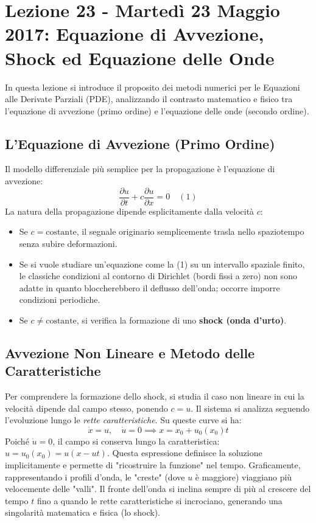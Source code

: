 \documentclass[12pt,a4paper]{article}
\begin{document}
\newpage
\section{Lezione 23 - Martedì 23 Maggio 2017: Equazione di Avvezione, Shock ed Equazione delle Onde}

In questa lezione si introduce il proposito dei metodi numerici per le Equazioni alle Derivate Parziali (PDE), analizzando il contrasto matematico e fisico tra l'equazione di avvezione (primo ordine) e l'equazione delle onde (secondo ordine).

\subsection{L'Equazione di Avvezione (Primo Ordine)}
Il modello differenziale più semplice per la propagazione è l'equazione di avvezione:
\begin{equation}
\frac{\partial u}{\partial t} + c \frac{\partial u}{\partial x} = 0 \quad (1)
\end{equation}
La natura della propagazione dipende esplicitamente dalla velocità $c$:
\begin{itemize}
    \item Se $c = \text{costante}$, il segnale originario semplicemente trasla nello spaziotempo senza subire deformazioni.
    \item Se si vuole studiare un'equazione come la (1) su un intervallo spaziale finito, le classiche condizioni al contorno di Dirichlet (bordi fissi a zero) non sono adatte in quanto bloccherebbero il deflusso dell'onda; occorre imporre condizioni periodiche.
    \item Se $c \neq \text{costante}$, si verifica la formazione di uno \textbf{shock (onda d'urto)}.
\end{itemize}

\subsection{Avvezione Non Lineare e Metodo delle Caratteristiche}
Per comprendere la formazione dello shock, si studia il caso non lineare in cui la velocità dipende dal campo stesso, ponendo $c = u$.
Il sistema si analizza seguendo l'evoluzione lungo le \textit{rette caratteristiche}. Su queste curve si ha:
\begin{equation}
\dot{x} = u, \quad \dot{u} = 0 \implies x = x_0 + u_0(x_0)t
\end{equation}
Poiché $\dot{u} = 0$, il campo si conserva lungo la caratteristica: $u = u_0(x_0) = u(x - ut)$. Questa espressione definisce la soluzione implicitamente e permette di "ricostruire la funzione" nel tempo.
Graficamente, rappresentando i profili d'onda, le "creste" (dove $u$ è maggiore) viaggiano più velocemente delle "valli". Il fronte dell'onda si inclina sempre di più al crescere del tempo $t$ fino a quando le rette caratteristiche si incrociano, generando una singolarità matematica e fisica (lo shock).
\end{document}
